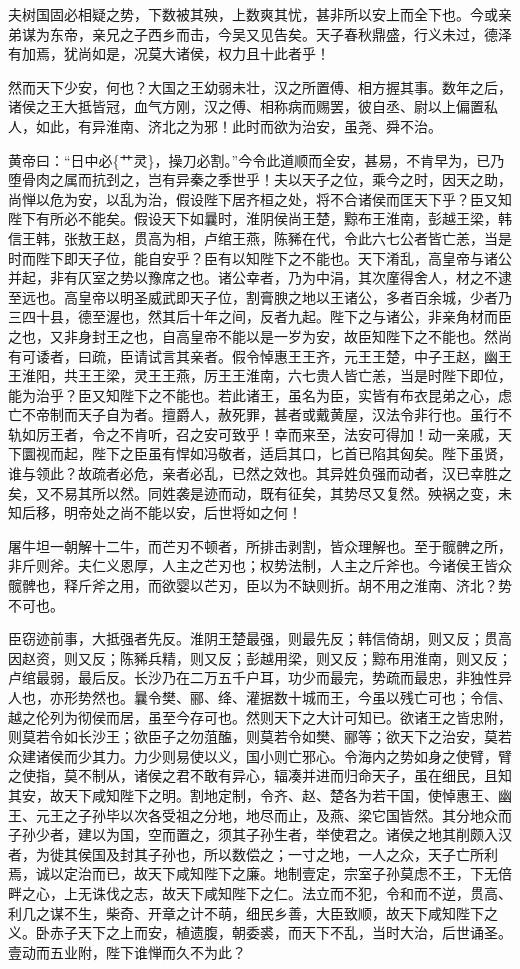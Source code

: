 \documentclass[]{article}
\begin{document}
夫树国固必相疑之势，下数被其殃，上数爽其忧，甚非所以安上而全下也。今或亲弟谋为东帝，亲兄之子西乡而击，今吴又见告矣。天子春秋鼎盛，行义未过，德泽有加焉，犹尚如是，况莫大诸侯，权力且十此者乎！

然而天下少安，何也？大国之王幼弱未壮，汉之所置傅、相方握其事。数年之后，诸侯之王大抵皆冠，血气方刚，汉之傅、相称病而赐罢，彼自丞、尉以上偏置私人，如此，有异淮南、济北之为邪！此时而欲为治安，虽尧、舜不治。

黄帝曰：``日中必\{艹灵\}，操刀必割。''今令此道顺而全安，甚易，不肯早为，已乃堕骨肉之属而抗刭之，岂有异秦之季世乎！夫以天子之位，乘今之时，因天之助，尚惮以危为安，以乱为治，假设陛下居齐桓之处，将不合诸侯而匡天下乎？臣又知陛下有所必不能矣。假设天下如曩时，淮阴侯尚王楚，黥布王淮南，彭越王梁，韩信王韩，张敖王赵，贯高为相，卢绾王燕，陈豨在代，令此六七公者皆亡恙，当是时而陛下即天子位，能自安乎？臣有以知陛下之不能也。天下淆乱，高皇帝与诸公并起，非有仄室之势以豫席之也。诸公幸者，乃为中涓，其次廑得舍人，材之不逮至远也。高皇帝以明圣威武即天子位，割膏腴之地以王诸公，多者百余城，少者乃三四十县，德至渥也，然其后十年之间，反者九起。陛下之与诸公，非亲角材而臣之也，又非身封王之也，自高皇帝不能以是一岁为安，故臣知陛下之不能也。然尚有可诿者，曰疏，臣请试言其亲者。假令悼惠王王齐，元王王楚，中子王赵，幽王王淮阳，共王王梁，灵王王燕，厉王王淮南，六七贵人皆亡恙，当是时陛下即位，能为治乎？臣又知陛下之不能也。若此诸王，虽名为臣，实皆有布衣昆弟之心，虑亡不帝制而天子自为者。擅爵人，赦死罪，甚者或戴黄屋，汉法令非行也。虽行不轨如厉王者，令之不肯听，召之安可致乎！幸而来至，法安可得加！动一亲戚，天下圜视而起，陛下之臣虽有悍如冯敬者，适启其口，匕首已陷其匈矣。陛下虽贤，谁与领此？故疏者必危，亲者必乱，已然之效也。其异姓负强而动者，汉已幸胜之矣，又不易其所以然。同姓袭是迹而动，既有征矣，其势尽又复然。殃祸之变，未知后移，明帝处之尚不能以安，后世将如之何！

屠牛坦一朝解十二牛，而芒刃不顿者，所排击剥割，皆众理解也。至于髋髀之所，非斤则斧。夫仁义恩厚，人主之芒刃也；权势法制，人主之斤斧也。今诸侯王皆众髋髀也，释斤斧之用，而欲婴以芒刃，臣以为不缺则折。胡不用之淮南、济北？势不可也。

臣窃迹前事，大抵强者先反。淮阴王楚最强，则最先反；韩信倚胡，则又反；贯高因赵资，则又反；陈豨兵精，则又反；彭越用梁，则又反；黥布用淮南，则又反；卢绾最弱，最后反。长沙乃在二万五千户耳，功少而最完，势疏而最忠，非独性异人也，亦形势然也。曩令樊、郦、绛、灌据数十城而王，今虽以残亡可也；令信、越之伦列为彻侯而居，虽至今存可也。然则天下之大计可知已。欲诸王之皆忠附，则莫若令如长沙王；欲臣子之勿菹醢，则莫若令如樊、郦等；欲天下之治安，莫若众建诸侯而少其力。力少则易使以义，国小则亡邪心。令海内之势如身之使臂，臂之使指，莫不制从，诸侯之君不敢有异心，辐凑并进而归命天子，虽在细民，且知其安，故天下咸知陛下之明。割地定制，令齐、赵、楚各为若干国，使悼惠王、幽王、元王之子孙毕以次各受祖之分地，地尽而止，及燕、梁它国皆然。其分地众而子孙少者，建以为国，空而置之，须其子孙生者，举使君之。诸侯之地其削颇入汉者，为徙其侯国及封其子孙也，所以数偿之；一寸之地，一人之众，天子亡所利焉，诚以定治而已，故天下咸知陛下之廉。地制壹定，宗室子孙莫虑不王，下无倍畔之心，上无诛伐之志，故天下咸知陛下之仁。法立而不犯，令和而不逆，贯高、利几之谋不生，柴奇、开章之计不萌，细民乡善，大臣致顺，故天下咸知陛下之义。卧赤子天下之上而安，植遗腹，朝委裘，而天下不乱，当时大治，后世诵圣。壹动而五业附，陛下谁惮而久不为此？
\end{document}
